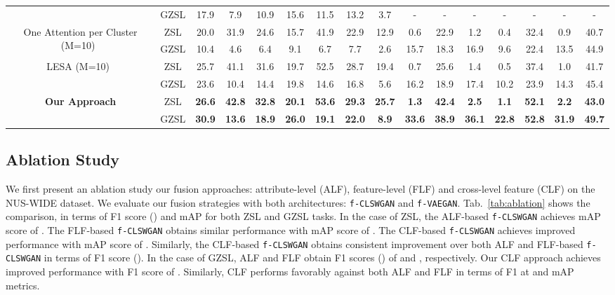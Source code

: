 \documentclass[final]{cvpr}
\newcommand{\clswgan}{\texttt{f-CLSWGAN}}
\newcommand{\vaegan}{\texttt{f-VAEGAN}}
\begin{document}
\begin{table*}[t]
{\begin{tabular}{ccccccccc|ccccccc}
 & GZSL & 17.9 & 7.9 & 10.9 & 15.6 & 11.5 & 13.2 & 3.7 & - & - & - & - & - & - & - \\ 
\cmidrule(lr){2-16}
\multirow{2}{*}{One Attention per Cluster (M=10)~\cite{huynh2020shared}} & ZSL & 20.0 & 31.9 & 24.6 & 15.7 & 41.9 & 22.9 & 12.9 & 0.6 & 22.9 & 1.2 & 0.4 & 32.4 & 0.9 & 40.7 \\
 & GZSL & 10.4 & 4.6 & 6.4 & 9.1 & 6.7 & 7.7 & 2.6 & 15.7 & 18.3 & 16.9 & 9.6 & 22.4 & 13.5 & 44.9 \\ 
\cmidrule(lr){2-16}
\multirow{2}{*}{LESA (M=10)~\cite{huynh2020shared}} & ZSL & 25.7 & 41.1 & 31.6 & 19.7 & 52.5 & 28.7 & 19.4 & 0.7 & 25.6 & 1.4 & 0.5 & 37.4 & 1.0 & 41.7 \\
 & GZSL & 23.6 & 10.4 & 14.4 & 19.8 & 14.6 & 16.8 & 5.6 & 16.2 & 18.9 & 17.4 & 10.2 & 23.9 & 14.3 & 45.4 \\ 
\cmidrule(lr){2-16}
\multirow{2}{*}{\textbf{Our Approach}} & ZSL & \textbf{26.6}  & \textbf{42.8}  & \textbf{32.8}  & \textbf{20.1}  & \textbf{53.6}  & \textbf{29.3}  & \textbf{25.7}  & \textbf{1.3} & \textbf{42.4} & \textbf{2.5} & \textbf{1.1}  & \textbf{52.1} & \textbf{2.2} & \textbf{43.0} \\
 & GZSL & \textbf{30.9}  & \textbf{13.6}  & \textbf{18.9}  & \textbf{26.0}  & \textbf{19.1}  & \textbf{22.0}  & \textbf{8.9}  & \textbf{33.6} & \textbf{38.9} & \textbf{36.1} & \textbf{22.8} & \textbf{52.8} & \textbf{31.9} & \textbf{49.7} \\
\bottomrule[0.1em]
\end{tabular}
}
\vspace{-0.15cm}
\label{tab:sota_nuswide_openimages}
\end{table*}

\subsection{Ablation Study\label{sec:ablation}}
We first present an ablation study \wrt our fusion approaches: attribute-level (ALF), feature-level (FLF) and cross-level feature (CLF) on the NUS-WIDE dataset. We evaluate our fusion strategies with both architectures: \clswgan{} and \vaegan{}. Tab.~\ref{tab:ablation} shows the comparison, in terms of F1 score () and mAP for both ZSL and GZSL tasks. In the case of ZSL, the ALF-based \clswgan{} achieves mAP score of . The FLF-based \clswgan{} obtains similar performance with mAP score of . The CLF-based \clswgan{} achieves improved performance with mAP score of . Similarly, the CLF-based \clswgan{} obtains consistent improvement over both ALF and FLF-based \clswgan{} in terms of F1 score (). In the case of GZSL, ALF and FLF obtain  F1 scores () of  and , respectively. Our CLF approach achieves improved performance with F1 score of . Similarly, CLF performs favorably against both ALF and FLF in terms of F1 at  and mAP metrics.  
\end{document}
